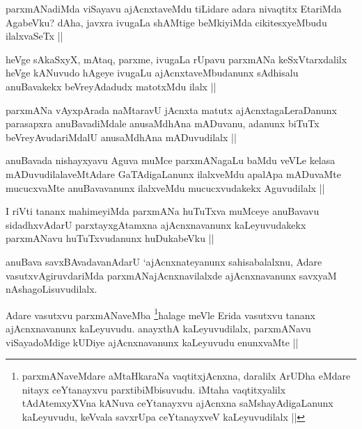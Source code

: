 \begin{artha}
parxmANadiMda viSayavu ajAcnxtaveMdu tiLidare adara nivaqtitx EtariMda AgabeVku? dAha, javxra ivugaLa shAMtige beMkiyiMda cikitesxyeMbudu ilalxvaSeTx ||
\end{artha}

\begin{artha}
heVge sAkaSxyX, mAtaq, parxme, ivugaLa rUpavu parxmANa keSxVtarxdalilx heVge kANuvudo hAgeye ivugaLu ajAcnxtaveMbudanunx sAdhisalu anuBavakekx beVreyAdadudx matotxMdu ilalx ||
\end{artha}

\begin{artha}
parxmANa vAyxpArada naMtaravU jAcnxta matutx ajAcnxtagaLeraDanunx parasapxra anuBavadiMdale anusaMdhAna mADuvanu, adanunx biTuTx beVreyAvudariMdalU anusaMdhAna mADuvudilalx ||
\end{artha}

\begin{artha}
anuBavada nishayxyavu Aguva muMce parxmANagaLu baMdu veVLe kelasa mADuvudilalaveMtAdare GaTAdigaLanunx ilalxveMdu apalApa mADuvaMte mucucxvaMte anuBavavanunx ilalxveMdu mucucxvudakekx Aguvudilalx ||
\end{artha}

\begin{artha}
I riVti tananx mahimeyiMda parxmANa huTuTxva muMceye anuBavavu sidadhxvAdarU parxtayxgAtamxna ajAcnxnavanunx kaLeyuvudakekx parxmANavu huTuTxvudanunx huDukabeVku ||
\end{artha}

\begin{artha}
anuBava savxBAvadavanAdarU `ajAcnxnateyanunx sahisabalalxnu, Adare vasutxvAgiruvdariMda parxmANajAcnxnavilalxde ajAcnxnavanunx savxyaM nAshagoLisuvudilalx.
\end{artha}

\begin{artha}
Adare vasutxvu parxmANaveMba \footnote[1]{parxmANaveMdare aMtaHkaraNa vaqtitxjAcnxna, daralilx ArUDha eMdare nitayx ceYtanayxvu parxtibiMbisuvudu. iMtaha vaqtitxyalilx tAdAtemxyXVna kANuva ceYtanayxvu ajAcnxna saMshayAdigaLanunx kaLeyuvudu, keVvala savxrUpa ceYtanayxveV kaLeyuvudilalx ||}halage meVle Erida vasutxvu tananx ajAcnxnavanunx kaLeyuvudu. anayxthA kaLeyuvudilalx, parxmANavu viSayadoMdige kUDiye ajAcnxnavanunx kaLeyuvudu enunxvaMte ||
\end{artha}

